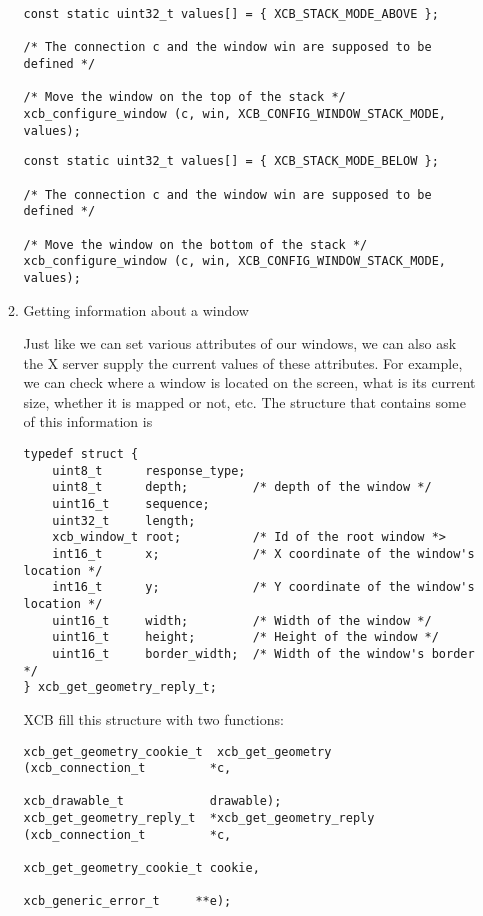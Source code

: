 \documentclass[12pt,oneside,titlepage]{book}
\begin{document}
\begin{enumerate}
\begin{enumerate}
\begin{verbatim}
const static uint32_t values[] = { XCB_STACK_MODE_ABOVE };

/* The connection c and the window win are supposed to be defined */

/* Move the window on the top of the stack */
xcb_configure_window (c, win, XCB_CONFIG_WINDOW_STACK_MODE, values);
\end{verbatim}

\begin{verbatim}
const static uint32_t values[] = { XCB_STACK_MODE_BELOW };

/* The connection c and the window win are supposed to be defined */

/* Move the window on the bottom of the stack */
xcb_configure_window (c, win, XCB_CONFIG_WINDOW_STACK_MODE, values);
\end{verbatim}
  \item
    \protect\hypertarget{wingetinfo}{}{Getting information about a
    window}

    Just like we can set various attributes of our windows, we can also
    ask the X server supply the current values of these attributes. For
    example, we can check where a window is located on the screen, what
    is its current size, whether it is mapped or not, etc. The structure
    that contains some of this information is

\begin{verbatim}
typedef struct {
    uint8_t      response_type;
    uint8_t      depth;         /* depth of the window */
    uint16_t     sequence;
    uint32_t     length;
    xcb_window_t root;          /* Id of the root window *>
    int16_t      x;             /* X coordinate of the window's location */
    int16_t      y;             /* Y coordinate of the window's location */
    uint16_t     width;         /* Width of the window */
    uint16_t     height;        /* Height of the window */
    uint16_t     border_width;  /* Width of the window's border */
} xcb_get_geometry_reply_t;
\end{verbatim}

    XCB fill this structure with two functions:

\begin{verbatim}
xcb_get_geometry_cookie_t  xcb_get_geometry       (xcb_connection_t         *c,
                                                   xcb_drawable_t            drawable);
xcb_get_geometry_reply_t  *xcb_get_geometry_reply (xcb_connection_t         *c,
                                                   xcb_get_geometry_cookie_t cookie,
                                                   xcb_generic_error_t     **e);
\end{verbatim}


\end{enumerate}
\end{enumerate}
\end{document}
